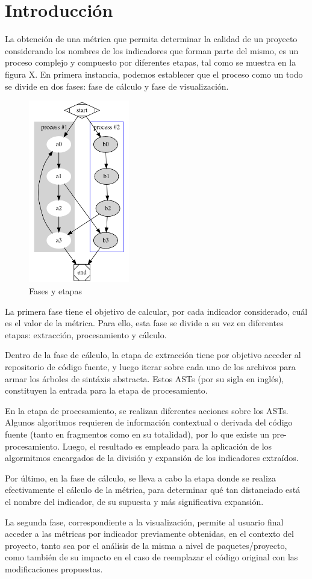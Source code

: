 \section{Introducción}

La obtención de una métrica que permita determinar la calidad de un proyecto considerando
los nombres de los indicadores que forman parte del mismo, es un proceso complejo y compuesto
por diferentes etapas, tal como se muestra en la figura X.
En primera instancia, podemos establecer que el proceso como un todo se divide en dos fases:
fase de cálculo y fase de visualización.

\begin{figure}[H]
    \includegraphics[height=8cm]{implementation/phases.png}
    \centering
    \caption{Fases y etapas}
  \end{figure}

La primera fase tiene el objetivo de calcular, por cada indicador considerado, cuál es el
valor de la métrica.
Para ello, esta fase se divide a su vez en diferentes etapas: extracción, procesamiento y
cálculo.

Dentro de la fase de cálculo, la etapa de extracción tiene por objetivo acceder al repositorio
de código fuente, y luego iterar sobre cada uno de los archivos para armar los árboles de sintáxis
abstracta.
Estos ASTs (por su sigla en inglés), constituyen la entrada para la etapa de procesamiento.

En la etapa de procesamiento, se realizan diferentes acciones sobre los ASTs.
Algunos algoritmos requieren de información contextual o derivada del código fuente (tanto en
fragmentos como en su totalidad), por lo que existe un pre-procesamiento.
Luego, el resultado es empleado para la aplicación de los algormitmos encargados de la división
y expansión de los indicadores extraídos.

Por último, en la fase de cálculo, se lleva a cabo la etapa donde se realiza efectivamente
el cálculo de la métrica, para determinar qué tan distanciado está el nombre del indicador,
de su supuesta y más significativa expansión.

La segunda fase, correspondiente a la visualización, permite al usuario final acceder
a las métricas por indicador previamente obtenidas, en el contexto del proyecto, tanto sea
por el análisis de la misma a nivel de paquetes/proyecto, como también de su impacto en
el caso de reemplazar el código original con las modificaciones propuestas.
